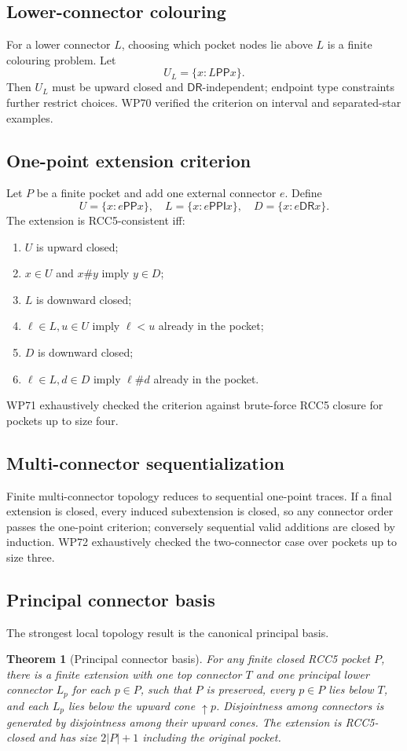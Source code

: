 \documentclass[11pt]{article}
\newtheorem{theorem}{Theorem}[section]
\newcommand{\PP}{\mathsf{PP}}
\newcommand{\PPI}{\mathsf{PPI}}
\newcommand{\DR}{\mathsf{DR}}
\newcommand{\up}{\uparrow}
\begin{document}
\subsection{Lower-connector colouring}
For a lower connector $L$, choosing which pocket nodes lie above $L$ is a finite colouring problem.  Let
\[
U_L=\{x:L\PP x\}.
\]
Then $U_L$ must be upward closed and $\DR$-independent; endpoint type constraints further restrict choices.  WP70 verified the criterion on interval and separated-star examples.

\subsection{One-point extension criterion}
Let $P$ be a finite pocket and add one external connector $e$.  Define
\[
U=\{x:e\PP x\},\quad L=\{x:e\PPI x\},\quad D=\{x:e\DR x\}.
\]
The extension is RCC5-consistent iff:
\begin{enumerate}
\item $U$ is upward closed;
\item $x\in U$ and $x\#y$ imply $y\in D$;
\item $L$ is downward closed;
\item $\ell\in L,u\in U$ imply $\ell<u$ already in the pocket;
\item $D$ is downward closed;
\item $\ell\in L,d\in D$ imply $\ell\#d$ already in the pocket.
\end{enumerate}
WP71 exhaustively checked the criterion against brute-force RCC5 closure for pockets up to size four.

\subsection{Multi-connector sequentialization}
Finite multi-connector topology reduces to sequential one-point traces.  If a final extension is closed, every induced subextension is closed, so any connector order passes the one-point criterion; conversely sequential valid additions are closed by induction.  WP72 exhaustively checked the two-connector case over pockets up to size three.

\subsection{Principal connector basis}
The strongest local topology result is the canonical principal basis.

\begin{theorem}[Principal connector basis]\label{thm:principal}
For any finite closed RCC5 pocket $P$, there is a finite extension with one top connector $T$ and one principal lower connector $L_p$ for each $p\in P$, such that $P$ is preserved, every $p\in P$ lies below $T$, and each $L_p$ lies below the upward cone $\up p$.  Disjointness among connectors is generated by disjointness among their upward cones.  The extension is RCC5-closed and has size $2|P|+1$ including the original pocket.
\end{theorem}
\end{document}
